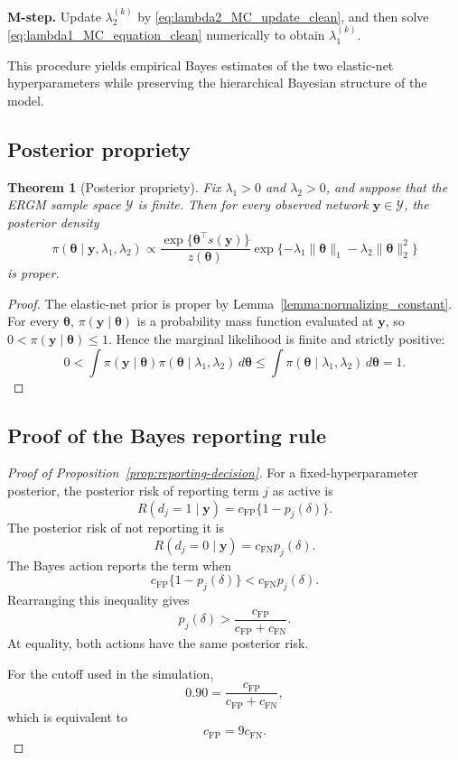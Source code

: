 \documentclass[preprint,12pt,authoryear]{elsarticle}
\newtheorem{theorem}{Theorem}
\def\bs{\boldsymbol}
\def\th{\boldsymbol{\theta}}
\begin{document}
\medskip
\noindent
\textbf{M-step.}
Update \(\lambda_2^{(k)}\) by \eqref{eq:lambda2_MC_update_clean}, and then solve
\eqref{eq:lambda1_MC_equation_clean} numerically to obtain
\(\lambda_1^{(k)}\).


\medskip


This procedure yields empirical Bayes estimates of the two elastic-net
hyperparameters while preserving the hierarchical Bayesian structure of the
model.


\subsection{Posterior propriety}\label{app:posterior propriety}

\begin{theorem}[Posterior propriety]
\label{thm:posterior-propriety}
Fix \(\lambda_1>0\) and \(\lambda_2>0\), and suppose that the ERGM sample space
\(\mathcal Y\) is finite. Then for every observed network
\(\bs y\in\mathcal Y\), the posterior density
\[
\pi(\th\mid \bs y,\lambda_1,\lambda_2)
\propto
\frac{\exp\{\th^\top s(\bs y)\}}{z(\th)}
\exp\{-\lambda_1\|\th\|_1-\lambda_2\|\th\|_2^2\}
\]
is proper.
\end{theorem}

\begin{proof}
The elastic-net prior is proper by
Lemma~\ref{lemma:normalizing_constant}. For every \(\th\),
\(\pi(\bs y\mid\th)\) is a probability mass function evaluated at \(\bs y\),
so \(0<\pi(\bs y\mid\th)\le1\). Hence the marginal likelihood is finite and
strictly positive:
\[
0<
\int \pi(\bs y\mid\th)\pi(\th\mid\lambda_1,\lambda_2)\,d\th
\le
\int \pi(\th\mid\lambda_1,\lambda_2)\,d\th
=1.
\]
\end{proof}

\subsection{Proof of the Bayes reporting rule}
\label{app:proof-reporting}

\begin{proof}[Proof of Proposition~\ref{prop:reporting-decision}]
For a fixed-hyperparameter posterior, the posterior risk of reporting term
\(j\) as active is
\[
R(d_j=1\mid\bs y)
=
c_{\mathrm{FP}}\{1-p_j(\delta)\}.
\]
The posterior risk of not reporting it is
\[
R(d_j=0\mid\bs y)
=
c_{\mathrm{FN}}p_j(\delta).
\]
The Bayes action reports the term when
\[
c_{\mathrm{FP}}\{1-p_j(\delta)\}
<
c_{\mathrm{FN}}p_j(\delta).
\]
Rearranging this inequality gives
\[
p_j(\delta)
>
\frac{c_{\mathrm{FP}}}
     {c_{\mathrm{FP}}+c_{\mathrm{FN}}}.
\]
At equality, both actions have the same posterior risk.

For the cutoff used in the simulation,
\[
0.90
=
\frac{c_{\mathrm{FP}}}
     {c_{\mathrm{FP}}+c_{\mathrm{FN}}},
\]
which is equivalent to
\[
c_{\mathrm{FP}}=9c_{\mathrm{FN}}.
\]
\end{proof}
\end{document}
